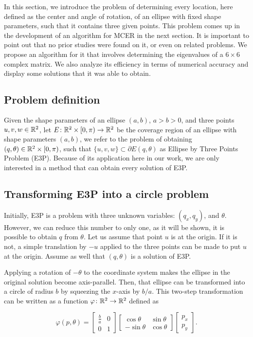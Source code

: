 In this section, we introduce the problem of determining every location, here defined as the center and angle of rotation, of an ellipse with fixed shape parameters, such that it contains three given points.
This problem comes up in the development of an algorithm for MCER in the next section. 
It is important to point out that no prior studies were found on it, or even on related problems.
We propose an algorithm for it that involves determining the eigenvalues of a $6\times6$ complex matrix. We also analyze its efficiency in terms of numerical accuracy and display some solutions that it was able to obtain.

\subsection{Problem definition}

Given the shape parameters of an ellipse $(a, b)$, $a > b >0$, and three points $u, v, w \in \mathbb{R}^2$, let $E\colon \mathbb{R}^2\times [0, \pi)\to\mathbb{R}^2$ be the coverage region of an ellipse with shape parameters $(a, b)$, we refer to the problem of obtaining $(q, \theta) \in \mathbb{R}^2\times [0, \pi)$, such that $\{u, v, w\} \subset \partial E(q, \theta)$ as Ellipse by Three Points Problem (E3P).
Because of its application here in our work, we are only interested in a method that can obtain every solution of E3P.

\subsection{Transforming E3P into a circle problem}

Initially, E3P is a problem with three unknown variables: $(q_x, q_y)$, and $\theta$. However, we can reduce this number to only one, as it will be shown, it is possible to obtain $q$ from $\theta$.
Let us assume that point $u$ is at the origin. If it is not, a simple translation by $-u$ applied to the three points can be made to put $u$ at the origin.
Assume as well that $(q, \theta)$ is a solution of E3P. 

Applying a rotation of $-\theta$ to the coordinate system makes the ellipse in the original solution become axis-parallel.
Then, that ellipse can be transformed into a circle of radius $b$ by squeezing the $x$-axis by $b/a$. This two-step transformation can be written as a function $\varphi\colon \mathbb{R}^2 \to \mathbb{R}^2$ defined as

\begin{equation}\label{eq:trpnts}
\varphi(p, \theta)=\left[\begin{array}{cc}
\frac{b}{a}&0\\
0&1
\end{array}\right]
\left[\begin{array}{cc}
\cos{\theta}&\sin{\theta}\\
-\sin{\theta}&\cos{\theta}
\end{array}\right]\left[\begin{array}{c}
p_x\\
p_y
\end{array}\right].
\end{equation}


